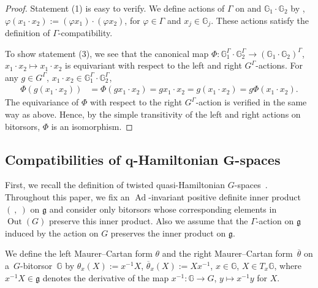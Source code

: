 \documentclass[10pt,a4paper]{amsart}
\numberwithin{equation}{section}
\theoremstyle{definition}
\newcommand{\Ad}{\operatorname{Ad}}
\newcommand{\Out}{\operatorname{Out}}
\newcommand{\bG}{\mathbb{G}}
\begin{document}
\begin{proof}
 Statement (1) is easy to verify.
 We define actions of $\Gamma$ on \smash{$\bG_1^{-1}$} and $\bG_1\cdot \bG_2$ by , $\varphi (x_1 \cdot x_2) := (\varphi x_1) \cdot (\varphi x_2)$,
 for $\varphi \in \Gamma$ and $x_j \in \bG_j$.
 These actions satisfy the definition of $\Gamma$-compatibility.

 To show statement (3), we see that the canonical map $ \Phi \colon \bG_1^{\Gamma} \cdot \bG_2^{\Gamma} \to (\bG_1 \cdot \bG_2)^{\Gamma}$, $ x_1 \cdot x_2 \mapsto x_1 \cdot x_2$
 is equivariant with respect to the left and right $G^{\Gamma}$-actions.
 For any $g \in G^{\Gamma}$, $x_1 \cdot x_2 \in \bG_1^{\Gamma} \cdot \bG_2^{\Gamma}$,
 \begin{align*}
 \Phi(g (x_1 \cdot x_2)) &= \Phi(g x_1 \cdot x_2) = gx_1 \cdot x_2 = g (x_1 \cdot x_2) = g \Phi(x_1 \cdot x_2).
 \end{align*}
 The equivariance of $\Phi$ with respect to the right $G^{\Gamma}$-action is verified in the same way as above.
 Hence, by the simple transitivity of the left and right actions on bitorsors, $\Phi$ is an isomorphism.
\end{proof}

\subsection[Compatibilities of q-Hamiltonian G-spaces]{Compatibilities of $\boldsymbol{q}$-Hamiltonian $\boldsymbol{G}$-spaces}

First, we recall the definition of twisted quasi-Hamiltonian $G$-spaces~\cite{B-Y2015,Meinrenken2017}.
Throughout this paper, we fix an $\Ad$-invariant positive definite inner product $(\ ,\ )$ on $\mathfrak{g}$ and consider only bitorsors whose corresponding elements in $\Out(G)$ preserve this inner product.
Also we assume that the $\Gamma$-action on $\mathfrak{g}$ induced by the action on $G$ preserves the inner product on $\mathfrak{g}$.

We define the left Maurer--Cartan form $\theta$ and the right Maurer--Cartan form~$\overline{\theta}$ on a~$G$-bitorsor~$\bG$ by
$\theta_x(X) := x^{-1}X$, $ \overline{\theta}_x(X) := Xx^{-1}$, $ x \in \bG$, $ X \in T_x\bG$,
where $x^{-1}X \in \mathfrak{g}$ denotes the derivative of the map $x^{-1} \colon \bG \to G$, $ y \mapsto x^{-1}y$ for $X$.
\end{document}
